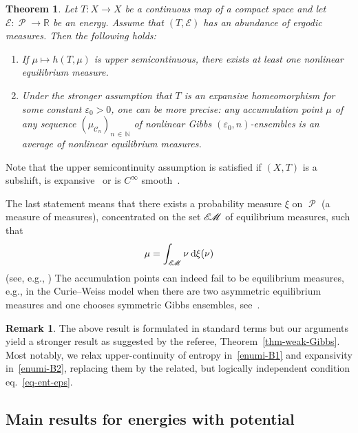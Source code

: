 \documentclass[10pt]{amsart}
\theoremstyle{definition}\newtheorem{defi}[theo]{Definition}\newtheorem{rema}[theo]{Remark}\newtheorem{exam}[theo]{Example}\newtheorem{exem}[theo]{Example}\newtheorem{nota}[theo]{Notation}
\theoremstyle{plain}
\newtheorem{theol}{Theorem}
\theoremstyle{plain}
\newcommand\eps{\varepsilon}
\newcommand\Prob{{\operatorname{\mathscr{P}}}}
\newcommand*{\dd} {\relax\ifnum\lastnodetype>0\mskip\medmuskip\fi\mathrm{d}}
\newcommand{\EM}{\mathscr{E\kern-2pt M}}
\newcommand*\8{\infty}
\newcommand\NN{\mathbb{N}}
\newcommand\RR{\mathbb{R}}
\newcommand{\En}{\mathcal{E}}
\newcommand{\cC}{\mathcal C}
\newcommand*{\romanenumi}{\renewcommand*{\theenumi}{\roman{enumi}}}
\begin{document}
\begin{theol}\label{thm-existence-NL}
Let $T:X\to X$ be a continuous map of a compact space and let $\En:\Prob\to\RR$ be an energy. Assume that $(T,\En)$ has an abundance of ergodic measures. Then the following holds:
\begin{enumerate}\romanenumi
\item \label{enumi-B1}
If $\mu\mapsto h(T,\mu)$ is upper semicontinuous, there exists at least one nonlinear equilibrium measure.
\item \label{enumi-B2}
Under the stronger assumption that $T$ is an expansive homeomorphism for some constant $\eps_0>0$, one can be more precise: any accumulation point $\mu$ of any sequence $(\mu_{\cC_n})_{n\,\in\,\NN}$ of nonlinear Gibbs $(\eps_0,n)$-ensembles is an average of nonlinear equilibrium measures.
\end{enumerate}
\end{theol}

Note that the upper semicontinuity assumption is satisfied if $(X,T)$ is a subshift, is expansive~\cite{Walters-book} or is $C^\infty$ smooth~\cite{Buzzi-SIM}.


The last statement means that there exists a probability measure $\xi$ on $\Prob$ (a measure of measures), concentrated on the set $\EM$ of equilibrium measures, such that
\[
\mu = \int_{\EM} \nu \dd\xi(\nu)
\]
(see, e.g., \cite[Proposition~1.2]{Phelps-book}) The accumulation points can indeed fail to be equilibrium measures, e.g., in the Curie--Weiss model when there are two asymmetric equilibrium measures and one chooses symmetric Gibbs ensembles, see~\cite{Leplaideur-Watbled}.

\begin{rema}\label{rem-exist-theo}
The above result is formulated in standard terms but our arguments yield a stronger result as suggested by the referee, Theorem~\ref{thm-weak-Gibbs}. Most notably, we relax upper-continuity of entropy in~\eqref{enumi-B1} and expansivity in~\eqref{enumi-B2}, replacing them by the related, but logically independent condition eq.~\eqref{eq-ent-eps}.
\end{rema}



\subsection{Main results for energies with potential}\label{subsec-energy}
\end{document}
